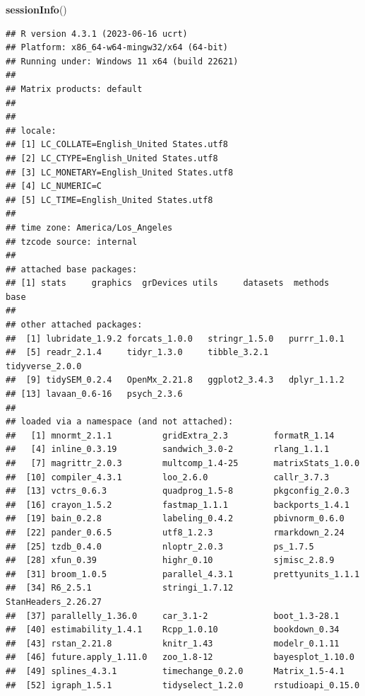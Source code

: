 \documentclass[
  11pt,
]{book}
\newenvironment{Shaded}{\begin{snugshade}}{\end{snugshade}}
\newcommand{\FunctionTok}[1]{\textcolor[rgb]{0.27,0.27,0.27}{\textbf{#1}}}
\newcommand{\NormalTok}[1]{#1}
\begin{document}
\begin{Shaded}
\begin{Highlighting}[]
\FunctionTok{sessionInfo}\NormalTok{()}
\end{Highlighting}
\end{Shaded}

\begin{verbatim}
## R version 4.3.1 (2023-06-16 ucrt)
## Platform: x86_64-w64-mingw32/x64 (64-bit)
## Running under: Windows 11 x64 (build 22621)
## 
## Matrix products: default
## 
## 
## locale:
## [1] LC_COLLATE=English_United States.utf8 
## [2] LC_CTYPE=English_United States.utf8   
## [3] LC_MONETARY=English_United States.utf8
## [4] LC_NUMERIC=C                          
## [5] LC_TIME=English_United States.utf8    
## 
## time zone: America/Los_Angeles
## tzcode source: internal
## 
## attached base packages:
## [1] stats     graphics  grDevices utils     datasets  methods   base     
## 
## other attached packages:
##  [1] lubridate_1.9.2 forcats_1.0.0   stringr_1.5.0   purrr_1.0.1    
##  [5] readr_2.1.4     tidyr_1.3.0     tibble_3.2.1    tidyverse_2.0.0
##  [9] tidySEM_0.2.4   OpenMx_2.21.8   ggplot2_3.4.3   dplyr_1.1.2    
## [13] lavaan_0.6-16   psych_2.3.6    
## 
## loaded via a namespace (and not attached):
##   [1] mnormt_2.1.1          gridExtra_2.3         formatR_1.14         
##   [4] inline_0.3.19         sandwich_3.0-2        rlang_1.1.1          
##   [7] magrittr_2.0.3        multcomp_1.4-25       matrixStats_1.0.0    
##  [10] compiler_4.3.1        loo_2.6.0             callr_3.7.3          
##  [13] vctrs_0.6.3           quadprog_1.5-8        pkgconfig_2.0.3      
##  [16] crayon_1.5.2          fastmap_1.1.1         backports_1.4.1      
##  [19] bain_0.2.8            labeling_0.4.2        pbivnorm_0.6.0       
##  [22] pander_0.6.5          utf8_1.2.3            rmarkdown_2.24       
##  [25] tzdb_0.4.0            nloptr_2.0.3          ps_1.7.5             
##  [28] xfun_0.39             highr_0.10            sjmisc_2.8.9         
##  [31] broom_1.0.5           parallel_4.3.1        prettyunits_1.1.1    
##  [34] R6_2.5.1              stringi_1.7.12        StanHeaders_2.26.27  
##  [37] parallelly_1.36.0     car_3.1-2             boot_1.3-28.1        
##  [40] estimability_1.4.1    Rcpp_1.0.10           bookdown_0.34        
##  [43] rstan_2.21.8          knitr_1.43            modelr_0.1.11        
##  [46] future.apply_1.11.0   zoo_1.8-12            bayesplot_1.10.0     
##  [49] splines_4.3.1         timechange_0.2.0      Matrix_1.5-4.1       
##  [52] igraph_1.5.1          tidyselect_1.2.0      rstudioapi_0.15.0    

\end{verbatim}
\end{document}
